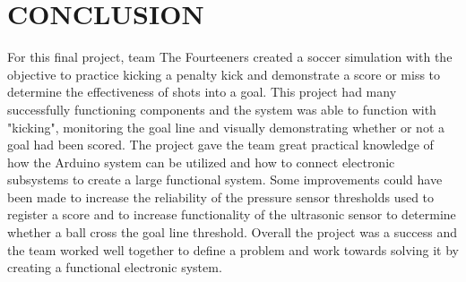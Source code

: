 \documentclass[12pt]{article}
\begin{document}
\section{CONCLUSION}
For this final project, team The Fourteeners created a soccer simulation with the objective to practice kicking a penalty kick and demonstrate a score or miss to determine the effectiveness of shots into a goal. This project had many successfully functioning components and the system was able to function with "kicking", monitoring the goal line and visually demonstrating whether or not a goal had been scored. The project gave the team great practical knowledge of how the Arduino system can be utilized and how to connect electronic subsystems to create a large functional system. Some improvements could have been made to increase the reliability of the pressure sensor thresholds used to register a score and to increase functionality of the ultrasonic sensor to determine whether a ball cross the goal line threshold. Overall the project was a success and the team worked well together to define a problem and work towards solving it by creating a functional electronic system.

\newpage



\newpage
\appendix
\end{document}
